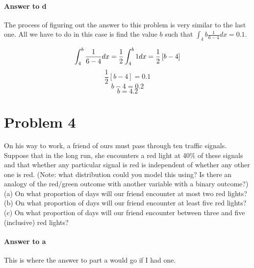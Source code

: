 \documentclass{article}
\begin{document}
	\paragraph{Answer to d}
	The process of figuring out the answer to this problem is very similar to the last one. All we have 
	to do in this case is find the value $b$ such that $\int_{4}{b} \frac{1}{6 - 4} dx = 0.1$.
	
	\begin{displaymath}
		\int_{4}^{b} \frac{1}{6 - 4} dx \\
		= \frac{1}{2} \int_{4}^{b} 1 dx \\
		= \frac{1}{2} \left[b - 4 \right]
	\end{displaymath}
	\begin{displaymath}
		\frac{1}{2} \left[b - 4 \right] = 0.1
	\end{displaymath}
	\begin{displaymath}
		b - 4 = 0.2
	\end{displaymath}
	\begin{displaymath}
		b = 4.2
	\end{displaymath}
	
\iffalse %
\section*{Problem 4}

	On his way to work, a friend of ours must pass through ten traffic signals. Suppose that in the
	long run, she encounters a red light at 40\% of these signals and that whether any particular
	signal is red is independent of whether any other one is red. (Note: what distribution could you
	model this using? Is there an analogy of the red/green outcome with another variable with a
	binary outcome?) \\
	
	\noindent (a) On what proportion of days will our friend encounter at most two red lights? \\
	(b) On what proportion of days will our friend encounter at least five red lights? \\
	(c) On what proportion of days will our friend encounter between three and five (inclusive) red
	lights?
	
	\paragraph{Answer to a}
	This is where the answer to part a would go if I had one.
	
\end{document}
